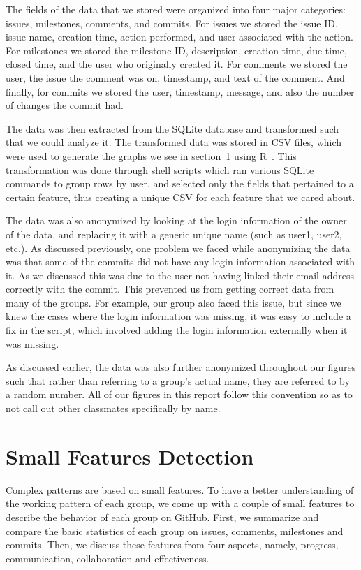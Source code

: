 \documentclass{acm_proc_article-sp}
\begin{document}
The fields of the data that we stored were organized into four major categories: issues, milestones, comments, and commits. For issues we stored the issue ID, issue name, creation time, action performed, and user associated with the action. For milestones we stored the milestone ID, description, creation time, due time, closed time, and the user who originally created it. For comments we stored the user, the issue the comment was on, timestamp, and text of the comment. And finally, for commits we stored the user, timestamp, message, and also the number of changes the commit had.

The data was then extracted from the SQLite database and transformed such that we could analyze it. The transformed data was stored in CSV files, which were used to generate the graphs we see in section~\ref{sec:smallfeatures} using R~\cite{rcite}. This transformation was done through shell scripts which ran various SQLite commands to group rows by user, and selected only the fields that pertained to a certain feature, thus creating a unique CSV for each feature that we cared about.

The data was also anonymized by looking at the login information of the owner of the data, and replacing it with a generic unique name (such as user1, user2, etc.). As discussed previously, one problem we faced while anonymizing the data was that some of the commits did not have any login information associated with it. As we discussed this was due to the user not having linked their email address correctly with the commit. This prevented us from getting correct data from many of the groups. For example, our group also faced this issue, but since we knew the cases where the login information was missing, it was easy to include a fix in the script, which involved adding the login information externally when it was missing.

As discussed earlier, the data was also further anonymized throughout our figures such that rather than referring to a group's actual name, they are referred to by a random number. All of our figures in this report follow this convention so as to not call out other classmates specifically by name.

\section{Small Features Detection}\label{sec:smallfeatures}

Complex patterns are based on small features. To have a better understanding of the working pattern of each group, we come up with a couple of small features to describe the behavior of each group on GitHub. First, we summarize and compare the basic statistics of each group on issues, comments, milestones and commits. Then, we discuss these features from four aspects, namely, progress, communication, collaboration and effectiveness.
\end{document}
